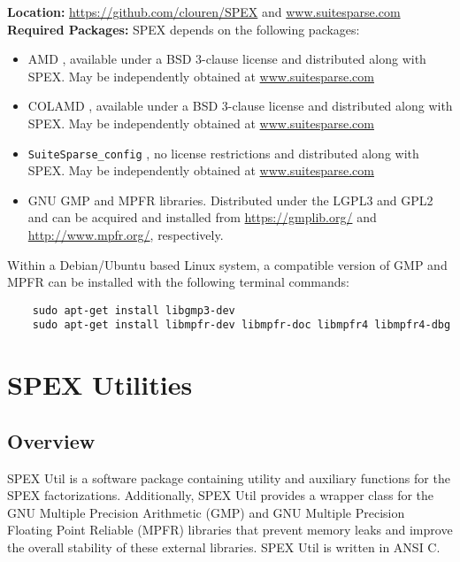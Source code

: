\documentclass[12pt]{report}
\theoremstyle{definition}
\begin{document}
\noindent \textbf{Location:} \url{https://github.com/clouren/SPEX} and
\url{www.suitesparse.com}\\

\noindent \textbf{Required Packages:} SPEX depends on the following packages:
    \begin{itemize} 
    \item AMD \cite{amestoy1996approximate,amestoy2004algorithmamd}, available under a BSD
3-clause license and distributed along with SPEX. May be independently obtained at \url{www.suitesparse.com}
    \item COLAMD \cite{davis2004column,davis2004algorithmcolamd}, available under a BSD
3-clause license and distributed along with SPEX. May be independently obtained at \url{www.suitesparse.com}
    \item
    \verb|SuiteSparse_config| \cite{davis2020suitesparse}, no license restrictions and distributed along with SPEX. May be independently obtained at \url{www.suitesparse.com}
    \item GNU GMP \cite{granlund2015gnu} and MPFR
\cite{fousse2007mpfr} libraries. Distributed under the LGPL3 and GPL2 and can be acquired and installed
from \url{https://gmplib.org/} and \url{http://www.mpfr.org/}, respectively.
    \end{itemize}

Within a Debian/Ubuntu based Linux system, a compatible version of GMP and MPFR can be installed with the following terminal commands:

{\small
\begin{verbatim}
    sudo apt-get install libgmp3-dev
    sudo apt-get install libmpfr-dev libmpfr-doc libmpfr4 libmpfr4-dbg
\end{verbatim} }


\chapter{SPEX Utilities} \label{ch:Util}

\section{Overview} \label{s:util:overview}

SPEX Util is a software package containing utility and auxiliary functions for the SPEX 
factorizations. Additionally, SPEX Util provides a wrapper class for
the GNU Multiple Precision Arithmetic (GMP) \cite{granlund2015gnu} and GNU
Multiple Precision Floating Point Reliable (MPFR) \cite{fousse2007mpfr}
libraries that prevent memory leaks and improve the overall stability of
these external libraries. SPEX Util is written in ANSI C.
\end{document}

